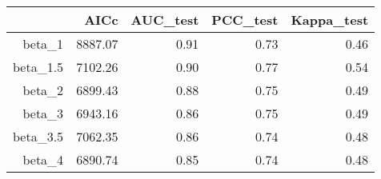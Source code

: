 \begin{table}[ht]
\centering
\begin{tabular}{rrrrr}
  \hline
 & AICc & AUC\_test & PCC\_test & Kappa\_test \\ 
  \hline
beta\_1 & 8887.07 & 0.91 & 0.73 & 0.46 \\ 
  beta\_1.5 & 7102.26 & 0.90 & 0.77 & 0.54 \\ 
  beta\_2 & 6899.43 & 0.88 & 0.75 & 0.49 \\ 
  beta\_3 & 6943.16 & 0.86 & 0.75 & 0.49 \\ 
  beta\_3.5 & 7062.35 & 0.86 & 0.74 & 0.48 \\ 
  beta\_4 & 6890.74 & 0.85 & 0.74 & 0.48 \\ 
   \hline
\end{tabular}
\end{table}
